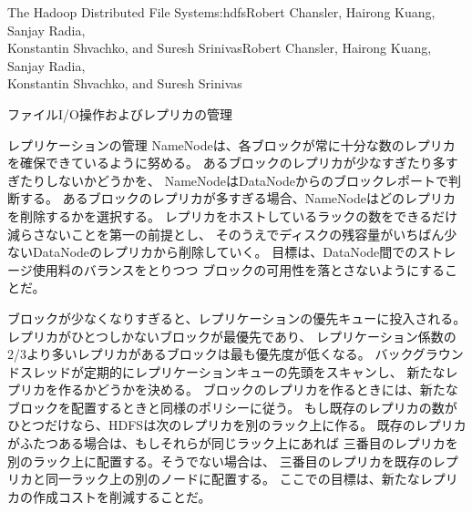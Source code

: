 \begin{aosachaptertoc}{The Hadoop Distributed File System}{s:hdfs}{Robert Chansler, Hairong Kuang, Sanjay Radia, \\ Konstantin Shvachko, and Suresh Srinivas}{Robert Chansler, Hairong Kuang, Sanjay Radia, \\ \hspace*{0.9cm} Konstantin Shvachko, and Suresh Srinivas}
\begin{aosasect1}{ファイルI/O操作およびレプリカの管理}
\begin{aosasect2}{レプリケーションの管理}
NameNodeは、各ブロックが常に十分な数のレプリカを確保できているように努める。
あるブロックのレプリカが少なすぎたり多すぎたりしないかどうかを、
NameNodeはDataNodeからのブロックレポートで判断する。
あるブロックのレプリカが多すぎる場合、NameNodeはどのレプリカを削除するかを選択する。
レプリカをホストしているラックの数をできるだけ減らさないことを第一の前提とし、
そのうえでディスクの残容量がいちばん少ないDataNodeのレプリカから削除していく。
目標は、DataNode間でのストレージ使用料のバランスをとりつつ
ブロックの可用性を落とさないようにすることだ。

ブロックが少なくなりすぎると、レプリケーションの優先キューに投入される。
レプリカがひとつしかないブロックが最優先であり、
レプリケーション係数の2/3より多いレプリカがあるブロックは最も優先度が低くなる。
バックグラウンドスレッドが定期的にレプリケーションキューの先頭をスキャンし、
新たなレプリカを作るかどうかを決める。
ブロックのレプリカを作るときには、新たなブロックを配置するときと同様のポリシーに従う。
もし既存のレプリカの数がひとつだけなら、HDFSは次のレプリカを別のラック上に作る。
既存のレプリカがふたつある場合は、もしそれらが同じラック上にあれば
三番目のレプリカを別のラック上に配置する。そうでない場合は、
三番目のレプリカを既存のレプリカと同一ラック上の別のノードに配置する。
ここでの目標は、新たなレプリカの作成コストを削減することだ。


\end{aosasect2}
\end{aosasect1}
\end{aosachaptertoc}
